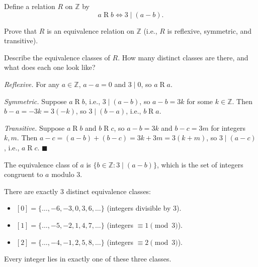 \documentclass[test,letterpaper]{cs20}
\begin{document}
\begin{problem}

Define a relation $R$ on $\mathbb{Z}$ by
\[
a \mathbin{R} b \iff 3 \mid (a - b).
\]

\subproblem Prove that $R$ is an equivalence relation on $\mathbb{Z}$ (i.e., $R$ is reflexive, symmetric, and transitive).

\subproblem Describe the equivalence classes of $R$. How many distinct classes are there, and what does each one look like?

\begin{solution}
\subsolution
\emph{Reflexive.} For any $a \in \mathbb{Z}$, $a - a = 0$ and $3 \mid 0$, so $a \mathbin{R} a$.

\emph{Symmetric.} Suppose $a \mathbin{R} b$, i.e., $3 \mid (a - b)$, so $a - b = 3k$ for some $k \in \mathbb{Z}$. Then $b - a = -3k = 3(-k)$, so $3 \mid (b - a)$, i.e., $b \mathbin{R} a$.

\emph{Transitive.} Suppose $a \mathbin{R} b$ and $b \mathbin{R} c$, so $a - b = 3k$ and $b - c = 3m$ for integers $k, m$. Then $a - c = (a - b) + (b - c) = 3k + 3m = 3(k + m)$, so $3 \mid (a - c)$, i.e., $a \mathbin{R} c$. $\blacksquare$

\subsolution The equivalence class of $a$ is $\{b \in \mathbb{Z} : 3 \mid (a - b)\}$, which is the set of integers congruent to $a$ modulo $3$.

There are exactly $\boxed{3}$ distinct equivalence classes:
\begin{itemize}
\item $[0] = \{\ldots, -6, -3, 0, 3, 6, \ldots\}$ (integers divisible by $3$).
\item $[1] = \{\ldots, -5, -2, 1, 4, 7, \ldots\}$ (integers $\equiv 1 \pmod 3$).
\item $[2] = \{\ldots, -4, -1, 2, 5, 8, \ldots\}$ (integers $\equiv 2 \pmod 3$).
\end{itemize}
Every integer lies in exactly one of these three classes.
\end{solution}

\pagebreak

\end{problem}
\end{document}
